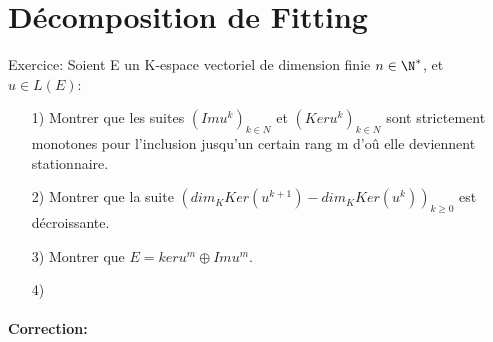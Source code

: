 \documentclass{book}
\begin{document}
\section{Décomposition de Fitting}
\begin{Ex}[]{Exercice:}{}
Soient E un K-espace vectoriel de dimension finie \( n \in \N^*\), et \(u \in L(E)\):
\\ \begin{itemize}
    \item[1)] Montrer que les suites \((Im u^k)_{k \in N}\) et \((Ker u^k)_{k \in N}\) sont strictement monotones pour l'inclusion jusqu'un certain rang m d'oû elle deviennent stationnaire.
    \item[2)] Montrer que la suite \((dim_{K}Ker(u^{k+1})-dim_{K}Ker(u^{k}))_{k\geq 0}\) est décroissante.
    \item[3)] Montrer que \(E=ker u^m \oplus Im u^m\).
    \item[4)]
\end{itemize}
\end{Ex}
\paragraph{Correction:}
\end{document}
